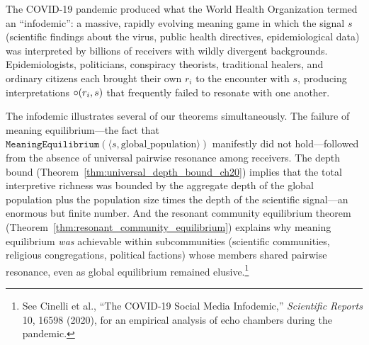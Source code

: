 \begin{example}
\label{ex:covid_infodemic}
The COVID-19 pandemic produced what the World Health Organization termed
an ``infodemic'': a massive, rapidly evolving meaning game in which the
signal $s$ (scientific findings about the virus, public health directives,
epidemiological data) was interpreted by billions of receivers with
wildly divergent backgrounds.  Epidemiologists, politicians, conspiracy
theorists, traditional healers, and ordinary citizens each brought their
own $r_i$ to the encounter with $s$, producing interpretations
$\circ(r_i, s)$ that frequently failed to resonate with one another.

The infodemic illustrates several of our theorems simultaneously.  The
failure of meaning equilibrium---the fact that
$\texttt{MeaningEquilibrium}(\langle s, \text{global\_population} \rangle)$
manifestly did not hold---followed from the absence of universal pairwise
resonance among receivers.  The depth bound
(Theorem~\ref{thm:universal_depth_bound_ch20}) implies that the total
interpretive richness was bounded by the aggregate depth of the global
population plus the population size times the depth of the scientific
signal---an enormous but finite number.  And the resonant community
equilibrium theorem (Theorem~\ref{thm:resonant_community_equilibrium})
explains why meaning equilibrium \emph{was} achievable within
subcommunities (scientific communities, religious congregations, political
factions) whose members shared pairwise resonance, even as global
equilibrium remained elusive.\footnote{See Cinelli et al., ``The
COVID-19 Social Media Infodemic,'' \textit{Scientific Reports} 10, 16598
(2020), for an empirical analysis of echo chambers during the pandemic.}
\end{example}

